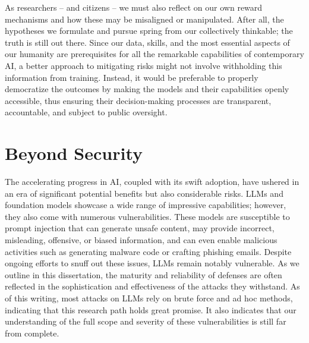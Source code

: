 As researchers -- and citizens -- we must also reflect on our own reward mechanisms and how these may be misaligned or manipulated.
After all, the hypotheses we formulate and pursue spring from our collectively thinkable; the truth is still out there.
Since our data, skills, and the most essential aspects of our humanity are prerequisites for all the remarkable capabilities of contemporary \gls{AI}, a better approach to mitigating risks might not involve withholding this information from training.
Instead, it would be preferable to properly democratize the outcomes by making the models and their capabilities openly accessible, thus ensuring their decision-making processes are transparent, accountable, and subject to public oversight.

\section{Beyond Security}

The accelerating progress in \gls{AI}, coupled with its swift adoption, have ushered in an era of significant potential benefits but also considerable risks.
\gls{LLM}s and foundation models showcase a wide range of impressive capabilities; however, they also come with numerous vulnerabilities.
These models are susceptible to prompt injection that can generate unsafe content, may provide incorrect, misleading, offensive, or biased information, and can even enable malicious activities such as generating malware code or crafting phishing emails.
Despite ongoing efforts to snuff out these issues, LLMs remain notably vulnerable.
As we outline in this dissertation, the maturity and reliability of defenses are often reflected in the sophistication and effectiveness of the attacks they withstand.
As of this writing, most attacks on LLMs rely on brute force and ad hoc methods, indicating that this research path holds great promise.
It also indicates that our understanding of the full scope and severity of these vulnerabilities is still far from complete.

